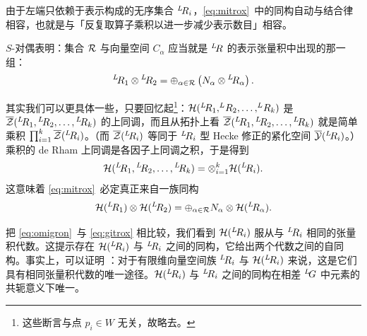由于左端只依赖于表示构成的无序集合 $^L\negthinspace R_i$，\eqref{eq:mitrox}\ 中的同构自动与结合律相容，也就是与「反复取算子乘积以进一步减少表示数目」相容。

$S$-对偶表明：集合 $\EUR$ 与向量空间 $C_\alpha$ 应当就是 $^L\negthinspace R$ 的表示张量积中出现的那一组：
\setcounter{equation}{24}
\begin{equation}\label{eq:omigron}
^L\negthinspace R_1\otimes {}^L\negthinspace
R_2=\oplus_{\alpha\in \EUR}\left(N_\alpha\otimes{} ^L\negthinspace R_\alpha\right).
\end{equation}

其实我们可以更具体一些，只要回忆起\footnote{这些断言与点 $p_i\in W$ 无关，故略去。}：${\cal H}({}^L\negthinspace R_1,^L\negthinspace R_2,\dots,^L\negthinspace R_k)$ 是 $\bar\EUZ({}^L\negthinspace R_1,{}^L\negthinspace R_2,\dots,{}^L\negthinspace R_k)$ 的上同调，而且从拓扑上看 $\bar\EUZ({}^L\negthinspace R_1,{}^L\negthinspace R_2,\dots,{}^L\negthinspace R_k)$ 就是简单乘积 $\prod_{i=1}^k\bar\EUZ({}^L\negthinspace R_i)$。（而 $\bar\EUZ({}^L\negthinspace R_i)$ 等同于 ${}^L\negthinspace R_i$ 型 Hecke 修正的紧化空间 $\bar {{\EUY}}({}^L\negthinspace R_i)$。）乘积的 de Rham 上同调是各因子上同调之积，于是得到 %
\setcounter{equation}{25}
\begin{equation}\label{eq:kipro}
{\cal H}({}^L\negthinspace
R_1,{}^L\negthinspace R_2,\dots,{}^L\negthinspace
R_k)=\otimes_{i=1}^k {\cal H}({}^L\negthinspace R_i).
\end{equation}
 这意味着 \eqref{eq:mitrox}\ 必定真正来自一族同构 %
\setcounter{equation}{26}
\begin{equation}\label{eq:gitrox}
{\cal H}({}^L\negthinspace R_1)\otimes
{\cal H}({}^L\negthinspace R_2)=\oplus_{\alpha\in \EUR}N_\alpha\otimes
{\cal H}({}^L\negthinspace R_\alpha).
\end{equation}

把 \eqref{eq:omigron}\ 与 \eqref{eq:gitrox} 相比较，我们看到 ${\cal H}({}^L\negthinspace R_i)$ 服从与 $^L\negthinspace R_i$ 相同的张量积代数。这提示存在 ${\cal H}({}^L\negthinspace R_i)$ 与 $^L\negthinspace R_i$ 之间的同构，它给出两个代数之间的自同构。事实上，可以证明 \cite{ref127}：对于有限维向量空间族 $^L\negthinspace R_i$ 与 ${\cal H}(^L\negthinspace R_i)$ 来说，这是它们具有相同张量积代数的唯一途径。${\cal H}({}^L\negthinspace R_i)$ 与 $^L\negthinspace R_i$ 之间的同构在相差 $^L\negthinspace G$ 中元素的共轭意义下唯一。

\par{}

